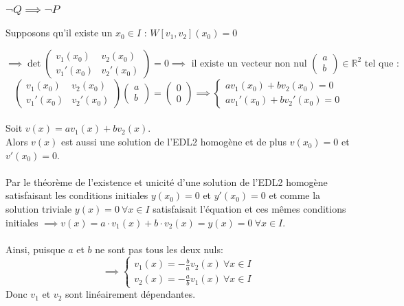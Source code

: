 \documentclass{article}
\begin{document}
\subsubsection{$ \neg Q \implies \neg P $}

Supposons qu'il existe un $ x_0 \in I $ : $ W[v_1, v_2](x_0) = 0 $

\[ \implies \det\begin{pmatrix}
v_1(x_0) & v_2(x_0)\\
v_1'(x_0) & v_2'(x_0)
\end{pmatrix} = 0 \implies \text{ il existe un vecteur non nul } \begin{pmatrix}
a \\
b
\end{pmatrix} \in \mathbb{R}^2  \text{ tel que : }
\]
\[ \begin{pmatrix}
v_1(x_0) & v_2(x_0)\\
v_1'(x_0) & v_2'(x_0)
\end{pmatrix}\begin{pmatrix}
a \\
b
\end{pmatrix} = \begin{pmatrix}
0 \\
0
\end{pmatrix} \implies
\begin{cases}
  av_1(x_0) + bv_2(x_0) = 0\\
  av_1'(x_0) + bv_2'(x_0) = 0
\end{cases}
\]\\
Soit $ v(x) = av_1(x) + bv_2(x) $.\\
Alors $ v(x) $ est aussi une solution de l'EDL2 homogène et de plus $ v(x_0) = 0 $ et $ v'(x_0) = 0 $.\\\\
Par le théorème de l'existence et unicité d'une solution de l'EDL2 homogène satisfaisant les conditions initiales $ y(x_0) = 0 $ et $ y'(x_0) = 0 $ et comme la solution triviale $ y(x) = 0\ \forall x \in I $ satisfaisait l'équation et ces mêmes conditions initiales $ \implies v(x) = a\cdot{v_1(x)} + b\cdot{v_2(x)} = y(x) = 0\ \forall x \in I. $\\\\
Ainsi, puisque $ a $ et $ b $ ne sont pas tous les deux nuls:
\[ \implies \begin{cases}
    v_1(x) = - \frac{b}{a}v_2(x)\ \forall x \in I\\
    v_2(x) = - \frac{a}{b}v_1(x)\ \forall x \in I
\end{cases}\]
Donc $ v_1 $ et $ v_2 $ sont linéairement dépendantes.
\end{document}
